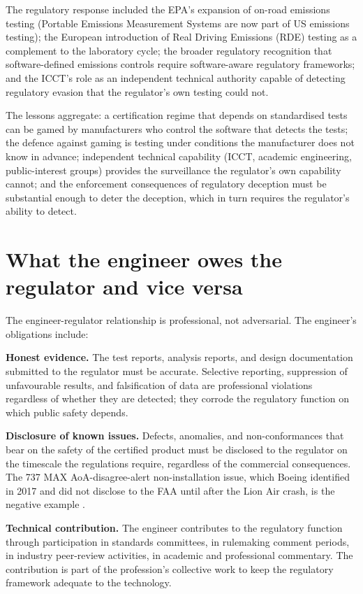 The regulatory response included the EPA's expansion of on-road emissions testing (Portable Emissions Measurement Systems are now part of US emissions testing); the European introduction of Real Driving Emissions (RDE) testing as a complement to the laboratory cycle; the broader regulatory recognition that software-defined emissions controls require software-aware regulatory frameworks; and the ICCT's role as an independent technical authority capable of detecting regulatory evasion that the regulator's own testing could not.

The lessons aggregate: a certification regime that depends on standardised tests can be gamed by manufacturers who control the software that detects the tests; the defence against gaming is testing under conditions the manufacturer does not know in advance; independent technical capability (ICCT, academic engineering, public-interest groups) provides the surveillance the regulator's own capability cannot; and the enforcement consequences of regulatory deception must be substantial enough to deter the deception, which in turn requires the regulator's ability to detect.

\section{What the engineer owes the regulator and vice versa}

The engineer-regulator relationship is professional, not adversarial. The engineer's obligations include:

\textbf{Honest evidence.} The test reports, analysis reports, and design documentation submitted to the regulator must be accurate. Selective reporting, suppression of unfavourable results, and falsification of data are professional violations regardless of whether they are detected; they corrode the regulatory function on which public safety depends.

\textbf{Disclosure of known issues.} Defects, anomalies, and non-conformances that bear on the safety of the certified product must be disclosed to the regulator on the timescale the regulations require, regardless of the commercial consequences. The 737 MAX AoA-disagree-alert non-installation issue, which Boeing identified in 2017 and did not disclose to the FAA until after the Lion Air crash, is the negative example \cite{acc:house-737max-2020}.

\textbf{Technical contribution.} The engineer contributes to the regulatory function through participation in standards committees, in rulemaking comment periods, in industry peer-review activities, in academic and professional commentary. The contribution is part of the profession's collective work to keep the regulatory framework adequate to the technology.

